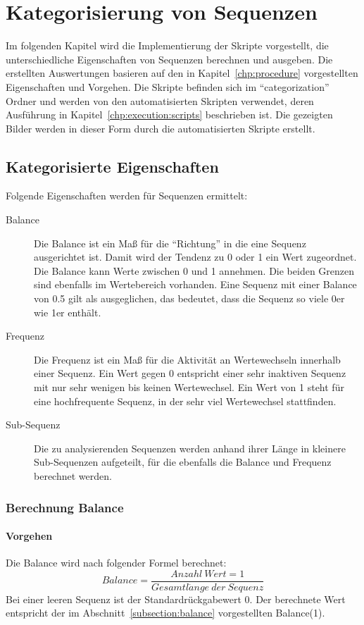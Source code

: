 \chapter{Kategorisierung von Sequenzen}
\label{chp:categorization}
Im folgenden Kapitel wird die Implementierung der Skripte vorgestellt, die unterschiedliche Eigenschaften von Sequenzen berechnen und ausgeben.
Die erstellten Auswertungen basieren auf den in Kapitel~\ref{chp:procedure} vorgestellten Eigenschaften und Vorgehen.
Die Skripte befinden sich im \enquote{categorization} Ordner und werden von den automatisierten Skripten verwendet, deren Ausführung in Kapitel~\ref{chp:execution:scripts} beschrieben ist.
Die gezeigten Bilder werden in dieser Form durch die automatisierten Skripte erstellt.
\section{Kategorisierte Eigenschaften}
Folgende Eigenschaften werden für Sequenzen ermittelt:
\begin{description}
	\item[Balance] Die Balance ist ein Maß für die \enquote{Richtung} in die eine Sequenz ausgerichtet ist. Damit wird der Tendenz zu 0 oder 1 ein Wert zugeordnet. Die Balance kann Werte zwischen 0 und 1 annehmen. Die beiden Grenzen sind ebenfalls im Wertebereich vorhanden. Eine Sequenz mit einer Balance von 0.5 gilt als ausgeglichen, das bedeutet, dass die Sequenz so viele 0er wie 1er enthält.
	\item[Frequenz] Die Frequenz ist ein Maß für die Aktivität an Wertewechseln innerhalb einer Sequenz. Ein Wert gegen 0 entspricht einer sehr inaktiven Sequenz mit nur sehr wenigen bis keinen Wertewechsel. Ein Wert von 1 steht für eine hochfrequente Sequenz, in der sehr viel Wertewechsel stattfinden.
	\item[Sub-Sequenz] Die zu analysierenden Sequenzen werden anhand ihrer Länge in kleinere Sub-Sequenzen aufgeteilt, für die ebenfalls die Balance und Frequenz berechnet werden.
\end{description}

\subsection{Berechnung Balance}

\subsubsection{Vorgehen}
Die Balance wird nach folgender Formel berechnet:
\[
Balance = \frac{Anzahl\ Wert = 1}{Gesamtl\ddot{a}nge\ der\ Sequenz}
\]
Bei einer leeren Sequenz ist der Standardrückgabewert 0.
Der berechnete Wert entspricht der im Abschnitt~\ref{subsection:balance} vorgestellten Balance(1).
